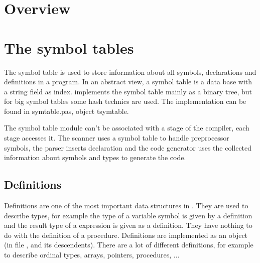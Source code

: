 \documentclass{report}
\begin{document}
\chapter{Overview}


\chapter{The symbol tables}

The symbol table is used to store information about all
symbols, declarations and definitions in a program.
In an abstract view, a symbol table is a data base with a string field
as index. \fpc implements the symbol table mainly as a binary tree, but
for big symbol tables some hash technics are used. The implementation
can be found in symtable.pas, object tsymtable.

The symbol table module can't be associated with a stage of the compiler,
each stage accesses it. 
The scanner uses a symbol table to handle preprocessor symbols, the
parser inserts declaration and the code generator uses the collected
information about symbols and types to generate the code.

\section{Definitions}

Definitions are one of the most important data structures in \fpc.
They are used to describe types, for example the type of a variable
symbol is given by a definition and the result type
of a expression is given as a definition. 
They have nothing to do with the definition of a procedure.
Definitions are implemented as an object (in file ,
 and its descendents). There are a lot of different
definitions, for example to describe
ordinal types, arrays, pointers, procedures, ...
\end{document}
